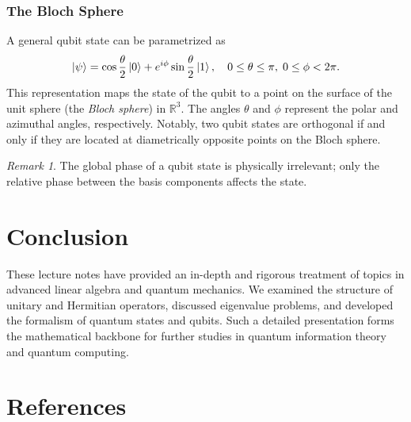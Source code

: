 \documentclass[12pt,oneside]{book}
\theoremstyle{remark}
\newtheorem{remark}[theorem]{Remark}
\begin{document}
	\subsection{The Bloch Sphere}
	
	A general qubit state can be parametrized as
	\[
	\ket{\psi} = \cos\frac{\theta}{2}\ket{0} + e^{i\phi}\sin\frac{\theta}{2}\ket{1}, \quad 0\le\theta\le\pi,\; 0\le\phi<2\pi.
	\]
	This representation maps the state of the qubit to a point on the surface of the unit sphere (the \emph{Bloch sphere}) in \(\mathbb{R}^3\). The angles \( \theta \) and \( \phi \) represent the polar and azimuthal angles, respectively. Notably, two qubit states are orthogonal if and only if they are located at diametrically opposite points on the Bloch sphere.
	
	\begin{remark}
		The global phase of a qubit state is physically irrelevant; only the relative phase between the basis components affects the state.
	\end{remark}
	
	\chapter{Conclusion}
	
	These lecture notes have provided an in-depth and rigorous treatment of topics in advanced linear algebra and quantum mechanics. We examined the structure of unitary and Hermitian operators, discussed eigenvalue problems, and developed the formalism of quantum states and qubits. Such a detailed presentation forms the mathematical backbone for further studies in quantum information theory and quantum computing.
	
	\backmatter
	
	\chapter*{References}
	
\end{document}
